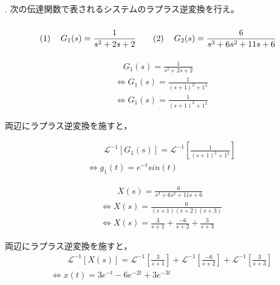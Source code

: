 \documentclass[a4paper,12pt]{article}
\begin{document}
\noindent
{}\\
\\
\\


. 次の伝達関数で表されるシステムのラプラス逆変換を行え。
\vspace{-4mm}
\[
\renewcommand{\arraystretch}{3.0} %
\begin{tabular}{@{}rl@{\quad\quad}rl@{}}
(1) & $G_1(s) = \dfrac{1}{s^2+2s+2}$                 & (2) & $G_2(s) = \dfrac{6}{s^3+6s^2+11s+6}$ \\
\end{tabular}
\]

\begin{tcolorbox}[title={1. (1) \(G_1(s) = \dfrac{1}{s^2+2s+2}\) }]
  \vspace{-3mm}
    \begin{align*}
    &\quad G_1(s) =\frac{ 1 }{ s^2 + 2s + 2}  \\
    &\Leftrightarrow G_1(s) =\frac{ 1 }{ ( s + 1 )^2+ 1^2} \\
    &\Leftrightarrow G_1(s) 
    = \frac{ 1}{ ( s + 1 )^2+ 1^2}
\end{align*}

\quad 両辺にラプラス逆変換を施すと，

\vspace{-3mm}
\begin{align*}
    &\qquad \mathcal{L}^{-1} \left[ G_1(s) \right] 
    =\mathcal{L}^{-1} \left[ \frac{ 1 }{ ( s + 1 )^2+ 1^2} \right]\\
    &\Leftrightarrow g_1(t) = e^{-t} sin(t)
\end{align*}
\end{tcolorbox}

\begin{tcolorbox}[title={1. (2) \(G_2(s) = \dfrac{6}{s^3+6s^2+11s+6}\) }]
  \vspace{-3mm}
\begin{align*}
    &\qquad X(s) =\frac{ 6 }{ s^3 +6 s^2+ 11s + 6 }  \\
    &\Leftrightarrow X(s) =\frac{ 6 }{ (s+1)(s+2)(s+3) }  \\
    &\Leftrightarrow X(s) 
    = \frac{3}{s+1}
    + \frac{-6}{s + 2}
    + \frac{3}{s + 3}
\end{align*}

\quad 両辺にラプラス逆変換を施すと，
\vspace{-3mm}
\begin{align*}
    &\qquad \mathcal{L}^{-1} \left[ X(s) \right] 
    =\mathcal{L}^{-1} \left[ \frac{3}{s+1} \right]
    +\mathcal{L}^{-1} \left[ \frac{-6}{s + 2} \right]
    +\mathcal{L}^{-1} \left[ \frac{3}{s + 3} \right] \\
    &\Leftrightarrow x(t) = 3e^{-t} - 6e^{-2t} + 3e^{-3t}
\end{align*}
\end{tcolorbox}
\end{document}
